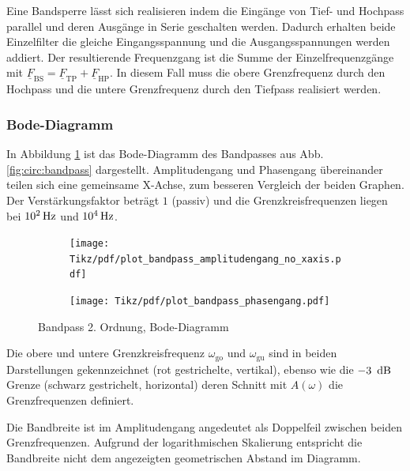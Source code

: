 \begin{frame}
{    Eine Bandsperre lässt sich realisieren indem die Eingänge von Tief- und Hochpass parallel und deren Ausgänge in Serie geschalten werden.
    Dadurch erhalten beide Einzelfilter die gleiche Eingangsspannung und die Ausgangsspannungen werden addiert.
    Der resultierende Frequenzgang ist die Summe der Einzelfrequenzgänge mit $\underline{F}_{\mathrm{BS}} = \underline{F}_{\mathrm{TP}} + \underline{F}_{\mathrm{HP}}$.
    In diesem Fall muss die obere Grenzfrequenz durch den Hochpass und die untere Grenzfrequenz durch den Tiefpass realisiert werden.



    \subsubsection{Bode-Diagramm}
    In Abbildung \ref{plot:bandpass:bode} ist das Bode-Diagramm des Bandpasses aus Abb. \ref{fig:circ:bandpass} dargestellt.
    Amplitudengang und Phasengang übereinander teilen sich eine gemeinsame X-Achse, zum besseren Vergleich der beiden Graphen.
    Der Verstärkungsfaktor beträgt $1$ (passiv) und die Grenzkreisfrequenzen liegen bei $10^2\operatorname{Hz}$ und $10^4\operatorname{Hz}$.

    \begin{figure}[h]\centering
        \begin{subfigure}{\textwidth}\centering
            \texttt{[image: Tikz/pdf/plot\_bandpass\_amplitudengang\_no\_xaxis.pdf]}
        \end{subfigure}\newline
        \begin{subfigure}{\textwidth}\centering
            \texttt{[image: Tikz/pdf/plot\_bandpass\_phasengang.pdf]}
        \end{subfigure}
        \caption{Bandpass 2. Ordnung, Bode-Diagramm}
        \label{plot:bandpass:bode}
    \end{figure}

    Die obere und untere Grenzkreisfrequenz $\omega_{\mathrm{go}}$ und $\omega_{\mathrm{gu}}$ sind
    in beiden Darstellungen gekennzeichnet (rot gestrichelte, vertikal),
    ebenso wie die $-3\ \operatorname{dB}$ Grenze (schwarz gestrichelt, horizontal)
    deren Schnitt mit $A(\omega)$ die Grenzfrequenzen definiert.
    
    Die Bandbreite ist im Amplitudengang angedeutet als Doppelfeil zwischen beiden Grenzfrequenzen.
    Aufgrund der logarithmischen Skalierung entspricht die Bandbreite nicht dem angezeigten geometrischen Abstand im Diagramm.

}
\end{frame}
